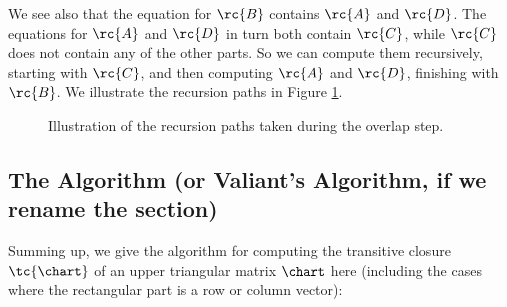 We see also that the equation for $\rc{B}$ contains $\rc{A}$ and $\rc{D}$. The equations for $\rc{A}$ and $\rc{D}$ in turn both contain $\rc{C}$, while $\rc{C}$ does not contain any of the other parts. So we can compute them recursively, starting with $\rc{C}$, and then computing $\rc{A}$ and $\rc{D}$, finishing with $\rc{B}$. We illustrate the recursion paths in Figure \ref{Fig:Overlap4}.
\begin{figure}
\caption{Illustration of the recursion paths taken during the overlap step.\label{Fig:Overlap4}}
\end{figure}
\subsection{The Algorithm (or Valiant's Algorithm, if we rename the section)}
\label{Valiant-summing-up}
Summing up, we give the algorithm for computing the transitive closure $\tc{\chart}$ of an upper triangular matrix $\chart$ here (including the cases where the rectangular part is a row or column vector):
